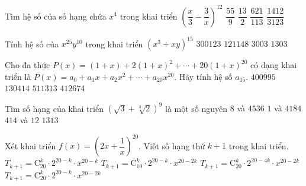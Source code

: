 \begin{ex}
	Tìm hệ số của số hạng chứa ${x^4}$ trong khai triển ${\left( {\dfrac{x}{3} - \dfrac{3}{x}} \right)^{12}}$
	\choice
	{\True $\dfrac{{55}}{9}$}
	{$\dfrac{{13}}{2}$}
	{$\dfrac{{621}}{{113}}$}
	{$\dfrac{{1412}}{{3123}}$}
	\loigiai{
		\[ \dfrac{1}{{{3^8}}}{( - 3)^4}\mathrm{C}_{12}^4 = \dfrac{{55}}{9} \]
	}
\end{ex}

\begin{ex}
	Tính hệ số của ${x^{25}}{y^{10}}$ trong khai triển ${\left( {{x^3} + xy} \right)^{15}}$
	\choice
	{$300123$}
	{$121148$}
	{\True $3003$}
	{$1303$}
	\loigiai{
		\[ \mathrm{C}_{15}^{10} = 3003 \]
	}
\end{ex}

\begin{ex}
	Cho đa thức $P\left( x \right) = \left( {1 + x} \right) + 2{\left( {1 + x} \right)^2} + \cdots + 20{\left( {1 + x} \right)^{20}}$ có dạng khai triển là $P\left( x \right) = {a_0} + {a_1}x + {a_2}{x^2} + \cdots + {a_{20}}{x^{20}}$. Hãy tính hệ số ${a_{15}}$.
	\choice
	{\True $400995$}
	{$130414$}
	{$511313$}
	{$412674$}
	\loigiai{
		\[ {a_{15}} = \displaystyle\sum\limits_{k = 15}^{20} {k\mathrm{C}_k^{15}} = 400995 \]
	}
\end{ex}

\begin{ex}
	Tìm số hạng của khai triển ${\left( {\sqrt 3 + \sqrt[3]{2}} \right)^9}$ là một số nguyên
	\choice
	{\True $8$ và $4536$}
	{$1$ và $4184$}
	{$414$ và $12$}
	{$1313$}
\end{ex}

\begin{ex}
	Xét khai triển $f(x)=\left(2x+\dfrac{1}{x}\right)^{20}$. Viết số hạng thứ $k+1$ trong khai triển.
	\choice
	{$T_{k+1}=\mathrm{C}_{20}^k\cdot 2^{20-k}\cdot x^{20-k}$}
	{$T_{k+1}=\mathrm{C}_{10}^k\cdot 2^{20-k}\cdot x^{20-2k}$}
	{$T_{k+1}=\mathrm{C}_{20}^k\cdot 2^{20-4k}\cdot x^{20-2k}$}
	{\True $T_{k+1}=\mathrm{C}_{20}^k\cdot 2^{20-k}\cdot x^{20-2k}$}
\end{ex}

